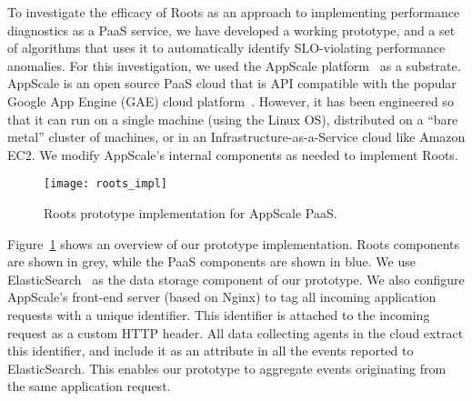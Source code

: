 To investigate the efficacy of Roots as an approach to
implementing performance diagnostics as a PaaS service, we have developed a
working prototype, and a set of algorithms that uses it to automatically
identify SLO-violating performance anomalies.
For this investigation, we used the AppScale
platform~\cite{6488671} as a substrate. AppScale is an open source PaaS cloud
that is API compatible
with the popular Google App Engine (GAE) cloud platform~\cite{gae}.  
However, it has been engineered so that it can run on a
single machine (using the Linux OS), distributed on a ``bare metal'' cluster
of machines, or in an Infrastructure-as-a-Service cloud like Amazon EC2.
We modify AppScale's internal components as needed to implement Roots.


\begin{figure}
\centering
\texttt{[image: roots\_impl]}
\caption{Roots prototype implementation for AppScale PaaS.}
\label{fig:roots_impl}
\end{figure}

Figure~\ref{fig:roots_impl} shows an overview of our prototype implementation. Roots components
are shown in grey, while the PaaS components are shown in blue.
We use ElasticSearch~\cite{Kononenko:2014:MMR:2597073.2597091} as the data storage component of our prototype. 
We also configure AppScale's front-end server (based on Nginx) to tag all incoming application requests
with a unique identifier. This identifier is attached to the incoming request as a custom HTTP header.
All data collecting agents in the cloud extract this identifier, and include it as an attribute
in all the events reported to ElasticSearch. This enables our prototype to aggregate events originating
from the same application request.


